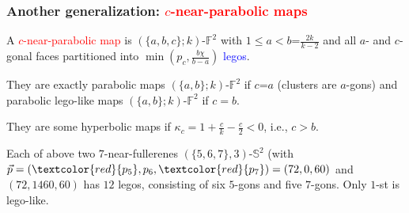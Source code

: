 \documentclass{beamer}
\begin{document}
\begin{frame}\frametitle{Another generalization: \textcolor{red}{$c$-near-parabolic maps}} 

\vspace{-2mm}

A \textcolor{red}{$c$-near-parabolic map} is  $(\{a, b, c\}; k)$-$\mathbb{F}^2$ 
 with $1$$\le$$ a$$<$$b$=$\frac{2k}{k-2}$ and all $a$- and $c$-gonal faces partitioned  into  $\min (p_c,\frac{b\chi}{b-a})$ 
  \textcolor{blue}{legos}.

They are exactly parabolic maps $(\{a, b\}; k)$-$\mathbb{F}^2$ if $c$=$a$ (clusters are $a$-gons)
and parabolic  lego-like  maps $(\{a, b\}; k)$-$\mathbb{F}^2$
 if $c=b$. 
 
 They are some hyperbolic maps if $\kappa_c=1+\frac{c}{k}-\frac{c}{2}<0$, i.e.,  
 $c>b $.
\vspace{-19mm}

\begin{center}\begin{minipage}{5.2cm}\centering
{}
\end{minipage}
\begin{minipage}{3.4cm}
\centering
{}
\end{minipage}\end{center}


\begin{center}
\vspace{-17mm}


Each of above two $7$-near-fullerenes $(\{5,6, 7\}, 3)$-$\mathbb{S}^2$ (with $\vec{p}=(
\textcolor{red}{p_5},p_6,
\textcolor{red}{p_7})=(72,0,60)$ and $(72,1460,60)$ has  $12$ legos, consisting of six $5$-gons and five $7$-gons. 
Only $1$-st is lego-like. 

\end{center}
\end{frame}
\end{document}
